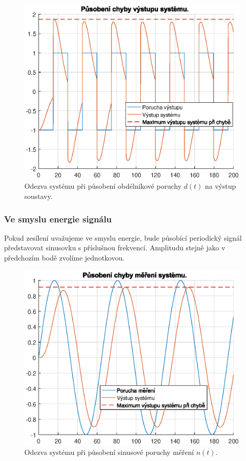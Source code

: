 \documentclass[a4paper,11pt]{article}
\begin{document}
\begin{figure}[htbp]
	\begin{center}
	\includegraphics[scale = 1.0]{obrazky/dS2.eps}
	\caption{Odezva systému při působení obdélníkové poruchy $ d\left ( t \right ) $ na výstup soustavy.}
	\label{fig:4_maxval-d}
	\end{center}
\end{figure}



\newpage 
\subsubsection{Ve smyslu energie signálu}
Pokud zesílení uvažujeme ve smyslu energie, bude působící periodický signál představovat sinusovku s příslušnou frekvencí. Amplitudu stejně jako v předchozím bodě zvolíme jednotkovou.
\begin{figure}[htbp]
	\begin{center}
	\includegraphics[scale = 1.0]{obrazky/nT.eps}
	\caption{Odezva systému při působení sinusové poruchy měření $ n\left ( t \right ) $.}
	\label{fig:4_energie-n}
	\end{center}
\end{figure}
\end{document}
